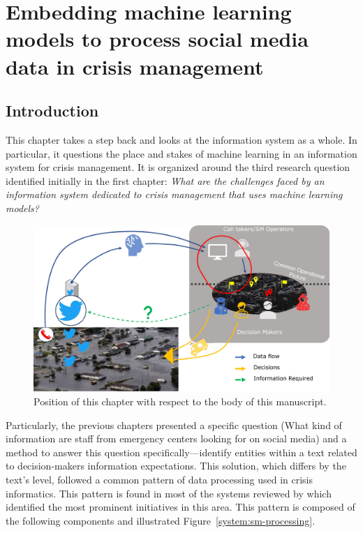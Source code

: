 \chapter{Embedding machine learning models to process social media data in crisis management}

\section*{Introduction}
This chapter takes a step back and looks at the information system as a whole.
In particular, it questions the place and stakes of machine learning in an information system for crisis management.
It is organized around the third research question identified initially in the first chapter:
\textit{What are the challenges faced by an information system dedicated to crisis management that uses machine learning models?}

\begin{figure}[htb]
    \centering
    \includegraphics[width=\textwidth]{figures/chap-5/position-chapter.pdf}
    \caption{Position of this chapter with respect to the body of this manuscript.}
    \label{system:big-picture-manuscrit}
\end{figure}

Particularly, the previous chapters presented a specific question (What kind of information are staff from emergency centers looking for on social media) and a method to answer this question specifically—identify entities within a text related to decision-makers information expectations.
This solution, which differs by the text's level, followed a common pattern of data processing used in crisis informatics.
This pattern is found in most of the systems reviewed by \textcite{ofliUsingArtificialIntelligence2020}
which identified the most prominent initiatives in this area.
This pattern is composed of the following components and illustrated Figure~\ref{system:sm-processing}.

